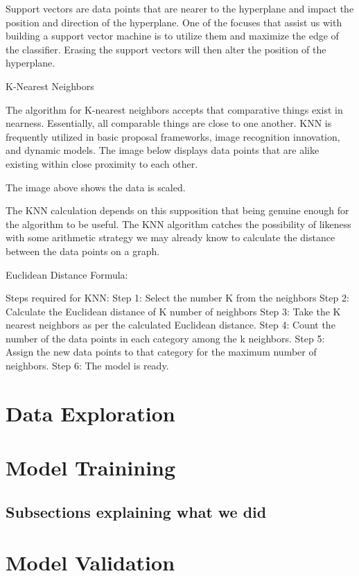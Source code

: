 \documentclass[a4paper,12pt]{report}
\begin{document}
Support vectors are data points that are nearer to the hyperplane and impact the position and direction of the hyperplane. One of the focuses that assist us with building a support vector machine is to utilize them and maximize the edge of the classifier. Erasing the support vectors will then alter the position of the hyperplane.

K-Nearest Neighbors
 
The algorithm for K-nearest neighbors accepts that comparative things exist in nearness. Essentially, all comparable things are close to one another. KNN is frequently utilized in basic proposal frameworks, image recognition innovation, and dynamic models. The image below displays data points that are alike existing within close proximity to each other.




The image above shows the data is scaled.




The KNN calculation depends on this supposition that being genuine enough for the algorithm to be useful. The KNN algorithm catches the possibility of likeness with some arithmetic strategy we may already know to calculate the distance between the data points on a graph.


Euclidean Distance Formula:


Steps required for KNN:
Step 1: Select the number K from the neighbors
Step 2: Calculate the Euclidean distance of K number of neighbors
Step 3: Take the K nearest neighbors as per the calculated Euclidean distance.
Step 4: Count the number of the data points in each category among the k neighbors.
Step 5: Assign the new data points to that category for the maximum number of neighbors.
Step 6: The model is ready.

\section{Data Exploration}
\section{Model Trainining}
\subsection{Subsections explaining what we did}
\section{Model Validation}
\end{document}

